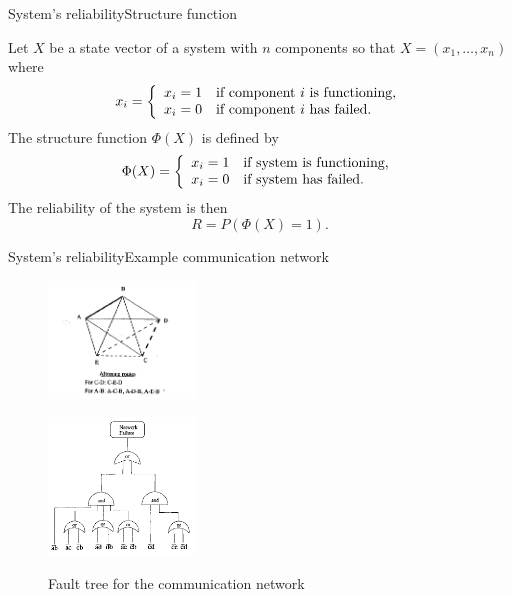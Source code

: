 \documentclass[handout]{beamer}
\begin{document}
\begin{frame}{System's reliability}{Structure function}
\begin{definition}
 Let $X$ be a state vector of a system with $n$ components so that $X=(x_1,\dots,x_n)$ where 
\[
  x_i = \left\{ \begin{array}{l l}
            x_i=1 & \textnormal{if component $i$ is functioning,}\\
            x_i=0 & \textnormal{if component $i$ has failed.}    
           \end{array} \right.
\]
The structure function $\Phi(X)$ is defined by
\[
  \Phi(X) = \left\{ \begin{array}{l l}
            x_i=1 & \textnormal{if system is functioning,}\\
            x_i=0 & \textnormal{if system has failed.}    
           \end{array} \right.
\]
The reliability of the system is then 
\[
 R = P(\Phi(X)=1).
\]

\end{definition}
\end{frame}



\begin{frame}{System's reliability}{Example communication network}
\begin{example}
\begin{figure}
\begin{minipage}[b]{0.4\linewidth}
 \centering
 \includegraphics[width=110pt, keepaspectratio=true]{./exampleCommunicationNetwork.png}
 \caption{Communication network with five nodes}
\end{minipage}
\hspace{0.2cm}
\begin{minipage}[b]{0.4\linewidth}
  \centering
 \includegraphics[width=110pt, keepaspectratio=true]{./faultTree.png}
 \label{fig:fault tree}
  \caption{Fault tree for the communication network}
\end{minipage}
\end{figure}
\end{example}


\end{frame}
\end{document}
